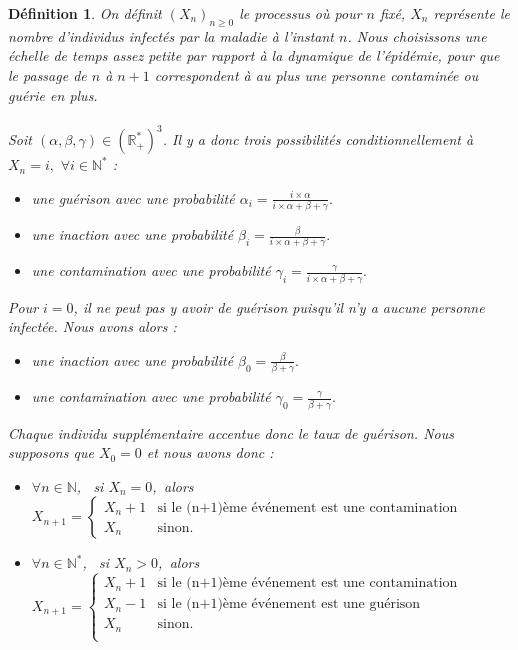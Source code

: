\documentclass[12pt,a4paper]{report}
\newtheorem{definition}{Définition}[section]
\theoremstyle{remark}
\begin{document}
\begin{definition}
On définit $(X_n)_{n\geq0}$ le processus où pour $n$ fixé, $X_n$  représente le nombre d'individus infectés par la maladie à l'instant $n$. Nous choisissons une échelle de temps assez petite par rapport à la dynamique de l'épidémie, pour que le passage de $n$ à $n+1$ correspondent à au plus une personne contaminée ou guérie en plus. 
\\
\\
Soit $(\alpha, \beta, \gamma) \in (\mathbb{R}_+^*)^3$. Il y a donc trois possibilités conditionnellement à $X_n = i, \, \, \forall i \in \mathbb{N}^*$ :  
\\
\begin{itemize}
\item une guérison avec une probabilité $\alpha_i=\frac{i \times \alpha}{i \times \alpha+\beta+\gamma}.$
\item une inaction avec une probabilité $\beta_i=\frac{\beta}{i \times \alpha+\beta+\gamma}.$
\item une contamination avec une probabilité $\gamma_i=\frac{\gamma}{i \times \alpha+\beta+\gamma}.$
\end{itemize}
\vspace{0.5cm}
Pour $i=0$, il ne peut pas y avoir de guérison puisqu'il n'y a aucune personne infectée. Nous avons alors :
\\
\begin{itemize}
\item une inaction avec une probabilité $\beta_0 = \frac{\beta}{\beta+\gamma}.$
\item une contamination avec une probabilité $\gamma_0=\frac{\gamma}{\beta+\gamma}.$
\end{itemize}
\vspace{0.5cm}

Chaque individu supplémentaire accentue donc le taux de guérison. Nous supposons que $X_{0} = 0$ et nous avons donc :
\\
\begin{itemize}
\item $\forall n \in \mathbb{N}$, \, si $X_n=0$,\, alors $X_{n+1} = \left\{
    \begin{array}{ll}
        X_n+1 & \mbox{si le (n+1)ème événement est une contamination } \\
        X_n & \mbox{sinon. }
    \end{array}
\right. $
\item $\forall n \in \mathbb{N}^*$, \, si $X_n > 0$,\, alors $X_{n+1} = \left\{
    \begin{array}{ll}
        X_n+1 & \mbox{si le (n+1)ème événement est une contamination} \\
        X_n-1 & \mbox{si le (n+1)ème événement est une guérison} \\
        X_n & \mbox{sinon. }\\
    \end{array}
\right. $
\end{itemize}
\end{definition}
\end{document}
